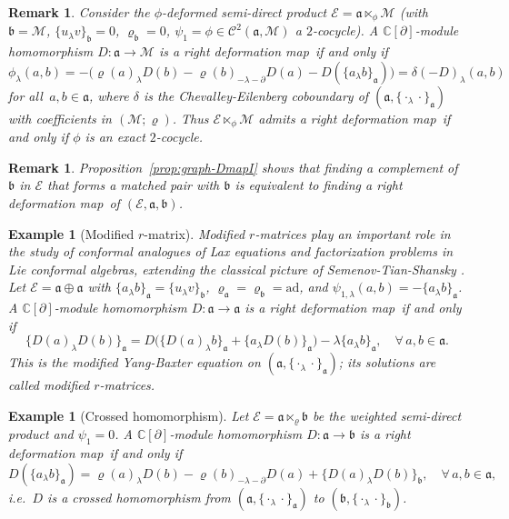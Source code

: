 \documentclass[a4paper,11pt]{article}
\def\Rg{\mathbb{C}[\partial]}
\def\Ep{\mathcal{E}}
\def\Vs{\mathfrak{a}}
\def\Ws{\mathfrak{b}}
\def\Mod{\mathcal{M}}
\def\rep{\varrho}
\def\Cch{\mathscr{C}}
\def\la{\lambda}
\def\p{\partial}
\newcommand{\ad}{\mathrm{ad}}
\numberwithin{equation}{section}
\newtheorem{example}[theorem]{Example}
\newtheorem{remark}[theorem]{Remark}
\begin{document}
\begin{remark}\label{rmk:DmapI-existence}
 Consider the $\phi$-deformed semi-direct product
$\Ep=\Vs\ltimes_\phi\Mod$ (with $\Ws=\Mod$, $\{u_\la v\}_\Ws=0$,
$\rep_\Ws=0$, $\psi_1=\phi\in\Cch^2(\Vs,\Mod)$ a $2$-cocycle).
A $\Rg$-module homomorphism $D:\Vs\to\Mod$ is a right deformation map\ if and only if
\[
  \phi_\la(a,b)
  = -\bigl(\rep(a)_\la D(b) - \rep(b)_{-\la-\p}D(a) - D(\{a_\la b\}_\Vs)\bigr)
  = \delta(-D)_\la(a,b)
\]
  for all \,$a,b\in\Vs$, where $\delta$ is the Chevalley-Eilenberg coboundary of $(\Vs,\{\cdot_\la\cdot\}_\Vs)$
with coefficients in $(\Mod;\rep)$.
Thus $\Ep\ltimes_\phi\Mod$ admits a right deformation map\ if and only if $\phi$ is an
exact $2$-cocycle.
\end{remark}
 


 
\begin{remark}
Proposition~\ref{prop:graph-DmapI} shows that finding a complement of
$\Ws$ in $\Ep$ that forms a matched pair with $\Ws$ is equivalent to
finding a right deformation map\ of $(\Ep,\Vs,\Ws)$.
\end{remark}
 
\begin{example}[Modified $r$-matrix]\label{ex:modified-r} Modified $r$-matrices play an important role in the study of
conformal analogues of Lax equations and factorization problems in Lie conformal  algebras, extending the classical picture of
Semenov-Tian-Shansky \cite{STS,STS2}. 
Let $\Ep=\Vs\oplus\Vs$ with $\{a_\la b\}_\Vs=\{u_\la v\}_\Ws$,
$\rep_\Vs=\rep_\Ws=\ad$, and
$\psi_{1,\la}(a,b)=-\{a_\la b\}_\Vs$.
A $\Rg$-module homomorphism $D:\Vs\to\Vs$ is a right deformation map\ if and only if
\begin{equation}\label{eq:conf-modified-r}
  \{D(a)_\la D(b)\}_\Vs 
  =D\!\bigl(\{D(a)_\la b\}_\Vs
  + \{a_\la D(b)\}_\Vs\bigr) -\la\{a_\la b\}_\Vs, \quad \forall\,a,b\in\Vs.
\end{equation}
This is the \textit{ modified Yang-Baxter equation} on
$(\Vs,\{\cdot_\la\cdot\}_\Vs)$; its solutions are called
\textit{ modified $r$-matrices}.
\end{example}
 
\begin{example}[Crossed homomorphism]\label{ex:crossed-hom}
Let $\Ep=\Vs\ltimes_\rep\Ws$ be the weighted semi-direct product and 
$\psi_1=0$.
A $\Rg$-module homomorphism $D:\Vs\to\Ws$ is a right deformation map\ if and only if
\begin{equation}\label{eq:conf-crossed-hom}
  D(\{a_\la b\}_\Vs)
  = \rep(a)_\la D(b) - \rep(b)_{-\la-\p}D(a)
  + \{D(a)_\la D(b)\}_\Ws, \quad \forall\,a,b\in\Vs,
\end{equation}
i.e.\ $D$ is a \textit{crossed homomorphism}
from $(\Vs,\{\cdot_\la\cdot\}_\Vs)$ to $(\Ws,\{\cdot_\la\cdot\}_\Ws)$.
\end{example}
 
\end{document}
